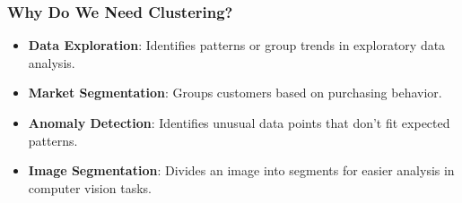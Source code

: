 \documentclass[aspectratio=169]{beamer}
\begin{document}
\begin{frame}[fragile]
    \frametitle{Why Do We Need Clustering?}
    \begin{itemize}
        \item \textbf{Data Exploration}: Identifies patterns or group trends in exploratory data analysis.
        \item \textbf{Market Segmentation}: Groups customers based on purchasing behavior.
        \item \textbf{Anomaly Detection}: Identifies unusual data points that don't fit expected patterns.
        \item \textbf{Image Segmentation}: Divides an image into segments for easier analysis in computer vision tasks.
    \end{itemize}
\end{frame}
\end{document}
